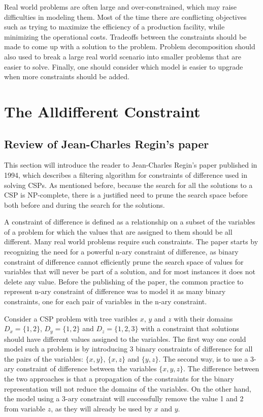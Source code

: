 \documentclass{l4proj}
\begin{document}
\noindent Real world problems are often large and over-constrained, which may raise difficulties in modeling them. Most of the time there are conflicting objectives such as trying to maximize the efficiency of a production facility, while minimizing the operational costs. Tradeoffs between the constraints should be made to come up with a solution to the problem. Problem decomposition should also used to break a large real world scenario into smaller problems that are easier to solve. Finally, one should consider which model is easier to upgrade when more constraints should be added.

\chapter{The Alldifferent Constraint}
\label{chap3alldiffconstraint}

\section{Review of Jean-Charles Regin's paper}
\noindent This section will introduce the reader to Jean-Charles Regin’s paper published in 1994, which describes a filtering algorithm for constraints of difference used in solving CSPs. As mentioned before, because the search for all the solutions to a CSP is NP-complete, there is a justified need to prune the search space before both before and during the search for the solutions.

\noindent A constraint of difference is defined as a relationship on a subset of the variables of a problem for which the values that are assigned to them should be all different. Many real world problems require such constraints. The paper starts by recognizing the need for a powerful n-ary constraint of difference, as binary constraint of difference cannot efficiently prune the search space of values for variables that will never be part of a solution, and for most instances it does not delete any value. Before the publishing of the paper, the common practice to represent n-ary constraint of difference was to model it as many binary constraints, one for each pair of variables in the n-ary constraint.

\noindent Consider a CSP problem with tree varibles $x$, $y$ and $z$ with their domains $D_x = \{1, 2\}$, $D_y = \{1, 2\}$ and $D_z = \{1, 2, 3\}$ with a constraint that solutions should have different values assigned to the variables. The first way one could model such a problem is by introducing 3 binary constraints of difference for all the pairs of the variables: $\{x, y\}$, $\{x, z\}$ and $\{y, z\}$. The second way, is to use a 3-ary constraint of difference between the variables $\{x, y, z\}$. The difference between the two approaches is that a propagation of the constraints for the binary representation will not reduce the domains of the variables. On the other hand, the model using a 3-ary constraint will successfully remove the value 1 and 2 from variable $z$, as they will already be used by $x$ and $y$.
\end{document}
